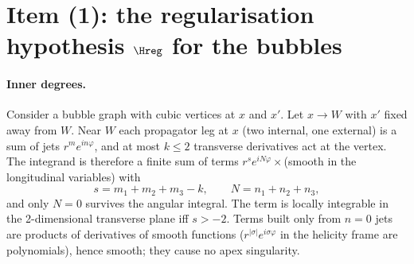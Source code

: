 \section{Item (1): the regularisation hypothesis \texorpdfstring{$\Hreg$}{(H\_reg)} for the bubbles}\label{sec:hreg}
\paragraph{Inner degrees.} Consider a bubble graph with cubic vertices at $x$ and $x'$. Let $x\to W$ with $x'$ fixed away from $W$. Near $W$ each propagator leg at $x$ (two internal, one external) is a sum of jets $r^{m}e^{in\varphi}$, and at most $k\le2$ transverse derivatives act at the vertex. The integrand is therefore a finite sum of terms $r^{s}e^{iN\varphi}\times$(smooth in the longitudinal variables) with
\[ s=m_1+m_2+m_3-k,\qquad N=n_1+n_2+n_3, \]
and only $N=0$ survives the angular integral. The term is locally integrable in the 2-dimensional transverse plane iff $s>-2$. Terms built only from $n=0$ jets are products of derivatives of smooth functions ($r^{|\sigma|}e^{i\sigma\varphi}$ in the helicity frame are polynomials), hence smooth; they cause no apex singularity.
